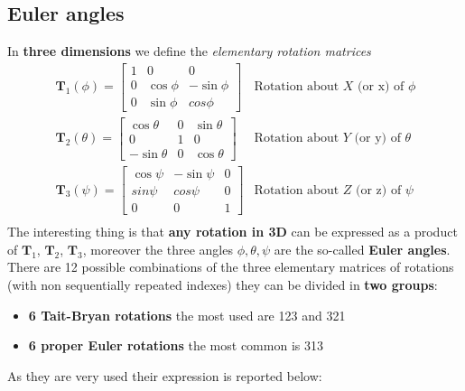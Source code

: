 \subsection{Euler angles}
In \textbf{three dimensions} we define the \textit{elementary rotation matrices}
\begin{equation*}
    \begin{aligned}
        &\mathbf{T}_1(\phi) = 
        \begin{bmatrix}
            1&0&0\\
            0&\cos\phi&-\sin\phi\\
            0&\sin\phi&cos\phi
        \end{bmatrix} & \text{Rotation about $X$ (or x) of $\phi$ }\\
        &\mathbf{T}_2(\theta) = 
        \begin{bmatrix}
            \cos\theta&0&\sin\theta\\
            0&1&0\\
            -\sin\theta&0&\cos\theta
        \end{bmatrix}  & \text{Rotation about $Y$ (or y) of $\theta$ } \\
        &\mathbf{T}_3(\psi) = \begin{bmatrix}
            \cos\psi&-\sin\psi&0\\
            sin\psi&cos\psi&0\\
            0&0&1
        \end{bmatrix}
        & \text{Rotation about $Z$ (or z) of $\psi$ }\\
    \end{aligned}
\end{equation*}
The interesting thing is that \textbf{any rotation in 3D} can be expressed as a product of $\mathbf{T}_1$, $\mathbf{T}_2$, $\mathbf{T}_3$, moreover the three angles $\phi, \theta, \psi$ are the so-called \textbf{Euler angles}.\\
There are 12 possible combinations of the three elementary matrices of rotations (with non sequentially repeated indexes) they can be divided in \textbf{two groups}: 
\begin{itemize}
    \itemsep0em
    \item[\ding{70}] \textbf{6 Tait-Bryan rotations} the most used are 123 and 321
    \item[\ding{70}] \textbf{6 proper Euler rotations} the most common is 313
\end{itemize}

As they are very used their expression is reported below:

